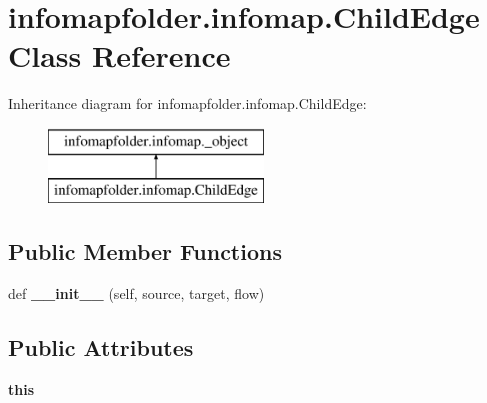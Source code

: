 \hypertarget{classinfomapfolder_1_1infomap_1_1ChildEdge}{}\section{infomapfolder.\+infomap.\+Child\+Edge Class Reference}
\label{classinfomapfolder_1_1infomap_1_1ChildEdge}
Inheritance diagram for infomapfolder.\+infomap.\+Child\+Edge\+:\begin{figure}[H]
\begin{center}
\leavevmode
\includegraphics[height=2.000000cm]{classinfomapfolder_1_1infomap_1_1ChildEdge}
\end{center}
\end{figure}
\subsection*{Public Member Functions}
\begin{DoxyCompactItemize}
\item 
\mbox{\label{classinfomapfolder_1_1infomap_1_1ChildEdge_a4bd5a5406941ce89815cc3772698754e}} 
def {\bfseries \+\_\+\+\_\+init\+\_\+\+\_\+} (self, source, target, flow)
\end{DoxyCompactItemize}
\subsection*{Public Attributes}
\begin{DoxyCompactItemize}
\item 
\mbox{\label{classinfomapfolder_1_1infomap_1_1ChildEdge_a5e98b837a60428cf7439e4a740cc9214}} 
{\bfseries this}
\end{DoxyCompactItemize}
